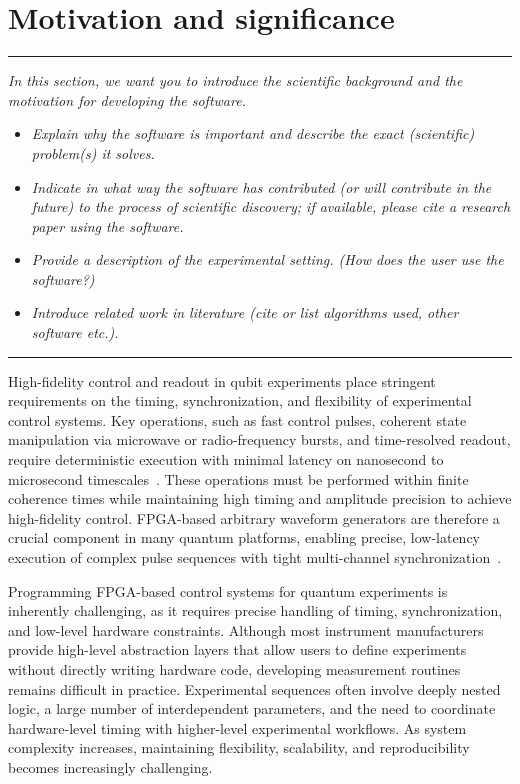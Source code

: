 \documentclass[numbers, preprint, twocolumn,10pt]{elsarticle}
\newenvironment{instructions}
  {\hrule\vspace{4pt}\begingroup\color{red}\itshape}
  {\endgroup\hrule\vspace{4pt}}
\begin{document}
\section{Motivation and significance}
\begin{instructions}
    \textit{In this section, we want you to introduce the scientific background and the motivation for developing the software.}
    
    \begin{itemize}
        \item \textit{Explain why the software is important and describe the exact (scientific) problem(s) it solves.}
        \item \textit{Indicate in what way the software has contributed (or will contribute in the future) to the process of scientific discovery; if available, please cite a research paper using the software.}
        \item \textit{Provide a description of the experimental setting. (How does the user use the software?)}
        \item \textit{Introduce related work in literature (cite or list algorithms used, other software etc.).}
    \end{itemize}
\end{instructions}
\noindent
High-fidelity control and readout in qubit experiments place stringent requirements on the timing, synchronization, and flexibility of experimental control systems. Key operations, such as fast control pulses, coherent state manipulation via microwave or radio-frequency bursts, and time-resolved readout, require deterministic execution with minimal latency on nanosecond to microsecond timescales~\cite{jones_mid-circuit_2026, acharya_quantum_2025, bravyi_high-threshold_2024, iqbal_non-abelian_2024}. These operations must be performed within finite coherence times while maintaining high timing and amplitude precision to achieve high-fidelity control. FPGA-based arbitrary waveform generators are therefore a crucial component in many quantum platforms, enabling precise, low-latency execution of complex pulse sequences with tight multi-channel synchronization~\cite{stefanazzi_qick_2022, xu_qubic_2021, qin_fpga-based_2020}.

Programming FPGA-based control systems for quantum experiments is inherently challenging, as it requires precise handling of timing, synchronization, and low-level hardware constraints. Although most instrument manufacturers provide high-level abstraction layers that allow users to define experiments without directly writing hardware code, developing measurement routines remains difficult in practice. Experimental sequences often involve deeply nested logic, a large number of interdependent parameters, and the need to coordinate hardware-level timing with higher-level experimental workflows. As system complexity increases, maintaining flexibility, scalability, and reproducibility becomes increasingly challenging.
\end{document}
